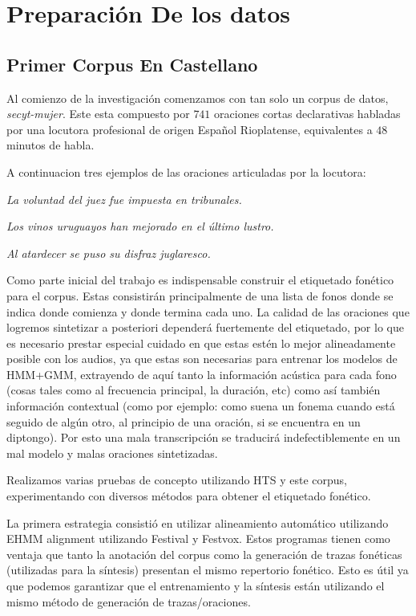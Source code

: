 \section{Preparación De los datos}

\subsection{Primer Corpus En Castellano}

Al comienzo de la investigación comenzamos con tan solo un corpus de datos, \textit{secyt-mujer}\cite{secytMujer}. Este esta compuesto por $741$ oraciones cortas declarativas habladas por una locutora profesional de origen Español Rioplatense, equivalentes a $48$ minutos de habla.

A continuacion tres ejemplos de las oraciones articuladas por la locutora:

\indent\indent \textit{La voluntad del juez fue impuesta en tribunales.}

\indent\indent \textit{Los vinos uruguayos han mejorado en el último lustro.}

\indent\indent \textit{Al atardecer se puso su disfraz juglaresco.}

Como parte inicial del trabajo es indispensable construir el etiquetado fonético para el corpus. Estas consistirán principalmente de una lista de fonos donde se indica donde comienza y donde termina cada uno. La calidad de las oraciones que logremos sintetizar a posteriori dependerá fuertemente del etiquetado, por lo que es necesario prestar especial cuidado en que estas estén lo mejor alineadamente posible con los audios, ya que estas son necesarias para entrenar los modelos de HMM+GMM, extrayendo de aquí tanto la información acústica para cada fono (cosas tales como al frecuencia principal, la duración, etc) como así también información contextual (como por ejemplo: como suena un fonema cuando está seguido de algún otro, al principio de una oración, si se encuentra en un diptongo). Por esto una mala transcripción se traducirá indefectiblemente en un mal modelo y malas oraciones sintetizadas.

Realizamos varias pruebas de concepto utilizando HTS y este corpus, experimentando con diversos métodos para obtener el etiquetado fonético. 

La primera estrategia consistió en utilizar alineamiento automático utilizando EHMM alignment \cite{phoneticCapturing} utilizando Festival y Festvox. Estos programas tienen como ventaja que tanto la anotación del corpus como la generación de trazas fonéticas (utilizadas para la síntesis) presentan el mismo repertorio fonético. Esto es útil ya que podemos garantizar que el entrenamiento y la síntesis están utilizando el mismo método de generación de trazas/oraciones.

